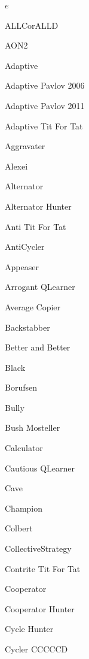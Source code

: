 \item $e$~\cite{axelrodproject}
\item ALLCorALLD~\cite{axelrodproject}
\item AON2~\cite{Hilbe2017}
\item Adaptive~\cite{Li2011}
\item Adaptive Pavlov 2006~\cite{kendall2007iterated}
\item Adaptive Pavlov 2011~\cite{Li2011}
\item Adaptive Tit For Tat~\cite{Tzafestas2000}
\item Aggravater~\cite{axelrodproject}
\item Alexei~\cite{lesswrong}
\item Alternator~\cite{Axelrod1981, Mittal2009}
\item Alternator Hunter~\cite{axelrodproject}
\item Anti Tit For Tat~\cite{Hilbe2013}
\item AntiCycler~\cite{axelrodproject}
\item Appeaser~\cite{axelrodproject}
\item Arrogant QLearner~\cite{axelrodproject}
\item Average Copier~\cite{axelrodproject}
\item Backstabber~\cite{axelrodproject}
\item Better and Better~\cite{prison}
\item Black~\cite{Axelrod1980b}
\item Borufsen~\cite{Axelrod1980b}
\item Bully~\cite{Nachbar1992}
\item Bush Mosteller~\cite{Izquierdo2008}
\item Calculator~\cite{prison}
\item Cautious QLearner~\cite{axelrodproject}
\item Cave~\cite{Axelrod1980b}
\item Champion~\cite{Axelrod1980b}
\item Colbert~\cite{Axelrod1980b}
\item CollectiveStrategy~\cite{Li2009}
\item Contrite Tit For Tat~\cite{Wu1995}
\item Cooperator~\cite{Axelrod1981, Mittal2009, Press2012}
\item Cooperator Hunter~\cite{axelrodproject}
\item Cycle Hunter~\cite{axelrodproject}
\item Cycler CCCCCD~\cite{axelrodproject}

